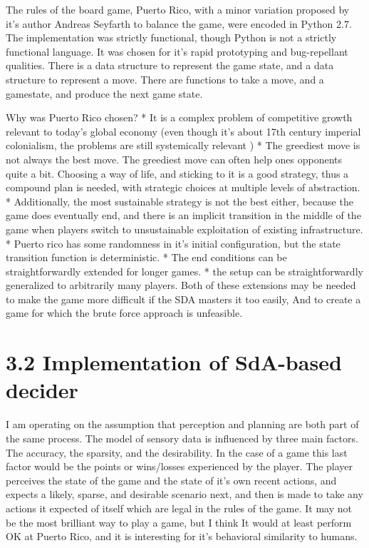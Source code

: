 \documentclass[11pt]{article}
\begin{document}
The rules of the board game, Puerto Rico, with a minor variation proposed by it's author Andreas Seyfarth to balance the game, were encoded in Python 2.7. The implementation was strictly functional, though Python is not a strictly functional language. It was chosen for it's rapid prototyping and bug-repellant qualities. There is a data structure to represent the game state, and a data structure to represent a move. There are functions to take a move, and a gamestate, and produce the next game state. 


Why was Puerto Rico chosen?
* It is a complex problem of competitive growth relevant to today's global economy (even though it's about 17th century imperial colonialism, the problems are still systemically relevant )
* The greediest move is not always the best move. The greediest move can often help ones opponents quite a bit. Choosing a way of life, and sticking to it is a good strategy, thus a compound plan is needed, with strategic choices at multiple levels of abstraction.
* Additionally, the most sustainable strategy is not the best either, because the game does eventually end, and there is an implicit transition in the middle of the game when players switch to unsustainable exploitation of existing infrastructure. 
* Puerto rico has some randomness in it's initial configuration, but the state transition function is deterministic. 
* The end conditions can be straightforwardly extended for longer games.
* the setup can be straightforwardly generalized to arbitrarily many players. Both of these extensions may be needed to make the game more difficult if the SDA masters it too easily, And to create a game for which the brute force approach is unfeasible.

\section{3.2 Implementation of SdA-based decider}
\label{Implementation of SdA-based decider}

I am operating on the assumption that perception and planning are both part of the same process. The model of sensory data is influenced by three main factors. The accuracy, the sparsity, and the desirability. In the case of a game this last factor would be the points or wins/losses experienced by the player. The player perceives the state of the game and the state of it's own recent actions, and expects a likely, sparse, and desirable scenario next, and then is made to take any actions it expected of itself which are legal in the rules of the game. It may not be the most brilliant way to play a game, but I think It would at least perform OK at Puerto Rico, and it is interesting for it's behavioral similarity to humans.
\end{document}
